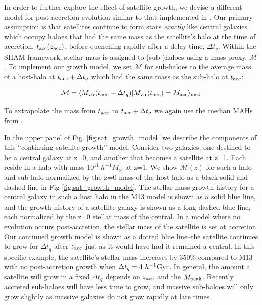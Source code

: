 \documentclass[a4paper,fleqn,usenatbib]{mnras}
\begin{document}
In order to further explore the effect of satellite growth, we devise a different model for post accretion evolution similar to that implemented in \cite{Behroozi:2015wx}.  Our primary assumption is that satellites continue to form stars {\em exactly} like central galaxies which occupy haloes that had the same mass as the satellite's halo at the time of accretion, $t_{\rm acc}(z_{\rm acc})$, before quenching rapidly after a delay time, $\Delta t_{q}$.  Within the SHAM framework, stellar mass is assigned to (sub-)haloes using a mass proxy, $\mathcal{M}$.  To implement our growth model, we set $\mathcal{M}$ for sub-haloes to the average mass of a host-halo at $t_{\rm acc} + \Delta t_{q}$ which had the same mass as the sub-halo at $t_{\rm acc}$:
%
\begin{linenomath}
\begin{equation}
\mathcal{M} = \langle M_{\rm vir}( t_{\rm acc}+\Delta t_{q}) | M_{\rm vir}( t_{\rm acc}) = M_{\rm acc}\rangle_{\rm med}
\end{equation}
\end{linenomath}
%
To extrapolate the mass from $t_{\rm acc}$ to $t_{\rm acc}+\Delta t_{q}$ we again use the median MAHs from \citet{Bosch:2014cu}.

In the upper panel of Fig. \ref{fig:sat_growth_model} we describe the components of this ``continuing satellite growth'' model.  Consider two galaxies, one destined to be a central galaxy at z=0, and another that becomes a satellite at z=1.  Each reside in a halo with mass $10^{11}~h^{-1}M_{\odot}$ at z=1.  We show $\mathcal{M}(z)$ for such a halo and sub-halo normalized by the z=0 mass of the host-halo as a black solid and dashed line in Fig \ref{fig:sat_growth_model}.  The stellar mass growth history for a central galaxy in such a host halo in the M13 model is shown as a solid blue line, and the growth history of a satellite galaxy is shown as a long dashed blue line, each  normalized by the z=0 stellar mass of the central.  In a model where no evolution occurs post-accretion, the stellar mass of the satellite is set at accretion.  Our continued growth model is shown as a dotted blue line--the satellite continues to grow for $\Delta t_q$ after $z_{\rm acc}$ just as it would have had it remained a central.  In this specific example, the satellite's stellar mass increases by 350\% compared to M13 with no post-accretion growth when $\Delta t_q=4~h^{-1}{\rm Gyr}$.  In general, the amount a satellite will grow in a fixed $\Delta t_q$ depends on $z_{\rm acc}$ and the $M_{\rm peak}$.  Recently accreted sub-haloes will have less time to grow, and massive sub-haloes will only grow slightly as massive galaxies do not grow rapidly at late times.  
\end{document}
